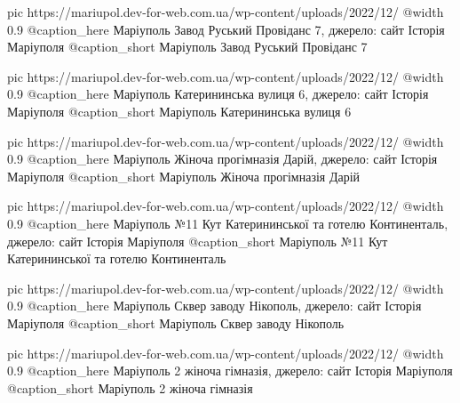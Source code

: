   pic https://mariupol.dev-for-web.com.ua/wp-content/uploads/2022/12/%
  @width 0.9
  @caption_here Маріуполь Завод Руський Провіданс 7, джерело: сайт Історія Маріуполя
  @caption_short Маріуполь Завод Руський Провіданс 7

  pic https://mariupol.dev-for-web.com.ua/wp-content/uploads/2022/12/%
  @width 0.9
  @caption_here Маріуполь Катерининська вулиця 6, джерело: сайт Історія Маріуполя
  @caption_short Маріуполь Катерининська вулиця 6

  pic https://mariupol.dev-for-web.com.ua/wp-content/uploads/2022/12/%
  @width 0.9
  @caption_here Маріуполь Жіноча прогімназія Дарій, джерело: сайт Історія Маріуполя
  @caption_short Маріуполь Жіноча прогімназія Дарій

  pic https://mariupol.dev-for-web.com.ua/wp-content/uploads/2022/12/%
  @width 0.9
  @caption_here Маріуполь №11 Кут Катерининської та готелю Континенталь, джерело: сайт Історія Маріуполя
  @caption_short Маріуполь №11 Кут Катерининської та готелю Континенталь

  pic https://mariupol.dev-for-web.com.ua/wp-content/uploads/2022/12/%
  @width 0.9
  @caption_here Маріуполь Сквер заводу Нікополь, джерело: сайт Історія Маріуполя
  @caption_short Маріуполь Сквер заводу Нікополь

  pic https://mariupol.dev-for-web.com.ua/wp-content/uploads/2022/12/%
  @width 0.9
  @caption_here Маріуполь 2 жіноча гімназія, джерело: сайт Історія Маріуполя
  @caption_short Маріуполь 2 жіноча гімназія

